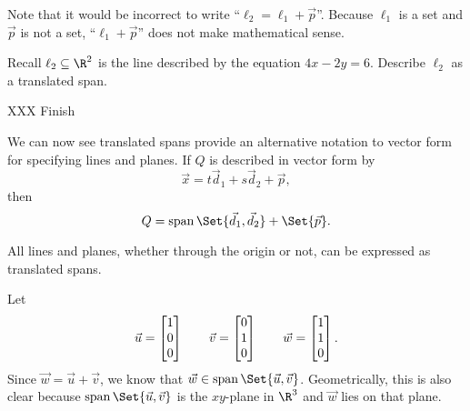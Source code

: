 \begin{center}
\end{center}

Note that it would be incorrect to write ``$\ell_2=\ell_1+\vec p$''. Because $\ell_1$
is a set and $\vec p$ is not a set, ``$\ell_1+\vec p$'' does not make mathematical sense.

\begin{example}
	Recall $\ell_2\subseteq\R^2$ is the line described by the equation $4x-2y=6$.
	Describe $\ell_2$ as a translated span.

	XXX Finish
\end{example}

We can now see translated spans provide an alternative notation to vector form 
for specifying lines and planes. If $Q$ is described in vector form by
\[
	\vec x=t\vec d_1+s\vec d_2+\vec p,
\]
then
\[
	Q=\Span\Set{\vec d_1,\vec d_2}+\Set{\vec p}.
\]



\begin{emphbox}[Takeaway]
	All lines and planes, whether through the origin or not, can be expressed as translated
	spans.
\end{emphbox}


Let
\[
	\vec u=\mat{1\\0\\0}\qquad\vec v=\mat{0\\1\\0}\qquad \vec w=\mat{1\\1\\0}.
\]
Since $\vec w=\vec u+\vec v$, we know that $\vec w\in\Span\Set{\vec u,\vec v}$. Geometrically,
this is also clear because $\Span\Set{\vec u,\vec v}$ is the $xy$-plane in $\R^3$ and 
$\vec w$ lies on that plane.

